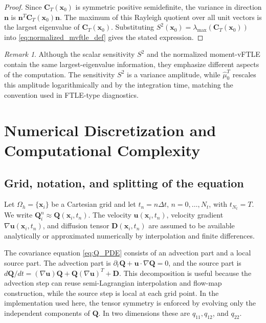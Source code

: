 \documentclass[a4paper,11pt]{article}
\numberwithin{equation}{section}
\theoremstyle{plain}
\theoremstyle{definition}
\theoremstyle{remark}
\newtheorem{remark}[theorem]{Remark}
\newcommand{\bx}{\mathbf{x}}
\newcommand{\bu}{\mathbf{u}}
\newcommand{\bn}{\mathbf{n}}
\newcommand{\bC}{\mathbf{C}}
\newcommand{\bD}{\mathbf{D}}
\newcommand{\bQ}{\mathbf{Q}}
\newcommand{\lmax}{\lambda_{\max}}
\begin{document}
\begin{proof}
Since \(\bC_T(\bx_0)\) is symmetric positive semidefinite, the variance in direction \(\bn\) is \(\bn^T\bC_T(\bx_0)\bn\).  The maximum of this Rayleigh quotient over all unit vectors is the largest eigenvalue of \(\bC_T(\bx_0)\).  Substituting \(S^2(\bx_0)=\lmax(\bC_T(\bx_0))\) into \eqref{eq:normalized_mvftle_def} gives the stated expression.
\end{proof}

\begin{remark}
Although the scalar sensitivity \(S^2\) and the normalized moment-vFTLE contain the same largest-eigenvalue information, they emphasize different aspects of the computation.  The sensitivity \(S^2\) is a variance amplitude, while \(\widehat{\mu}_0^T\) rescales this amplitude logarithmically and by the integration time, matching the convention used in FTLE-type diagnostics.
\end{remark}


\section{Numerical Discretization and Computational Complexity}
\label{sec:numerical_method}

\subsection{Grid, notation, and splitting of the equation}

Let \(\Omega_h=\{\bx_i\}\) be a Cartesian grid and let \(t_n=n\Delta t\), \(n=0,\ldots,N_t\), with \(t_{N_t}=T\).  We write \(\bQ_i^n\approx\bQ(\bx_i,t_n)\).  The velocity \(\bu(\bx_i,t_n)\), velocity gradient \(\nabla\bu(\bx_i,t_n)\), and diffusion tensor \(\bD(\bx_i,t_n)\) are assumed to be available analytically or approximated numerically by interpolation and finite differences.

The covariance equation \eqref{eq:Q_PDE} consists of an advection part and a local source part.  The advection part is \(\partial_t\bQ+\bu\cdot\nabla\bQ=0\), and the source part is \(d\bQ/dt=(\nabla\bu)\bQ+\bQ(\nabla\bu)^T+\bD\).  This decomposition is useful because the advection step can reuse semi-Lagrangian interpolation and flow-map construction, while the source step is local at each grid point.  In the implementation used here, the tensor symmetry is enforced by evolving only the independent components of \(\bQ\).  In two dimensions these are \(q_{11},q_{12}\), and \(q_{22}\).
\end{document}
